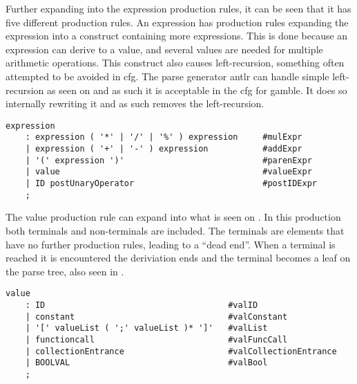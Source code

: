 Further expanding into the expression production rules, it can be seen that it has five different production rules. 
An expression has production rules expanding the expression into a construct containing more expressions.
This is done because an expression can derive to a value, and several values are needed for multiple arithmetic operations.
This construct also causes left-recursion, something often attempted to be avoided in \acrshort{cfg}.
The parse generator \acrshort{antlr} can handle simple left-recursion as seen on  and as such it is acceptable in the \acrshort{cfg} for \gls{gamble}.
It does so internally rewriting it and as such removes the left-recursion.
\begin{lstlisting}[caption={\acrshort{cfg} for Expressions in \gls{gamble}},frame=tlrb,label={lst:expression},numbers=none]
expression
    : expression ( '*' | '/' | '%' ) expression     #mulExpr
    | expression ( '+' | '-' ) expression           #addExpr
    | '(' expression ')'                            #parenExpr
    | value                                         #valueExpr
    | ID postUnaryOperator                          #postIDExpr
    ;
\end{lstlisting}
  
The value production rule can expand into what is seen on .
In this production both terminals and non-terminals are included.
The terminals are elements that have no further production rules, leading to a ``dead end''.
When a terminal is reached it is encountered the deriviation ends and the terminal becomes a leaf on the parse tree, also seen in .
\begin{lstlisting}[caption={\acrshort{cfg} for Values in \gls{gamble}},frame=tlrb,label={lst:value},numbers=none]
value
    : ID                                     #valID
    | constant                               #valConstant
    | '[' valueList ( ';' valueList )* ']'   #valList
    | functioncall                           #valFuncCall
    | collectionEntrance                     #valCollectionEntrance
    | BOOLVAL                                #valBool
    ;
\end{lstlisting}

